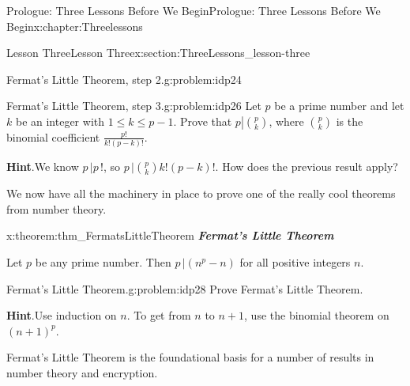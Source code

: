 \documentclass[oneside,10pt,]{book}
\newcommand{\blocktitlefont}{\relax}
\newcommand{\alert}[1]{\textbf{\textit{#1}}}
\numberwithin{equation}{section}
\begin{document}
\begin{chapterptx}{Prologue: Three Lessons Before We Begin}{}{Prologue: Three Lessons Before We Begin}{}{}{x:chapter:Threelessons}
\begin{sectionptx}{Lesson Three}{}{Lesson Three}{}{}{x:section:ThreeLessons_lesson-three}
\begin{problem}{Fermat's Little Theorem, step 2.}{g:problem:idp24}
\end{problem}
\begin{problem}{Fermat's Little Theorem, step 3.}{g:problem:idp26}%
 Let \(p\) be a prime number and let \(k\) be an integer with \(1\le k\le p-1\). Prove that \(p\left|{p \choose{}k}\right.\), where \({p \choose{}k}\) is the binomial coefficient \(\frac{p!}{k!(p-k)!}\).%
\par\smallskip%
\noindent\textbf{\blocktitlefont Hint}.\hypertarget{g:hint:idp27}{}\quad{}We know \(p\,|p\,!\), so \(p\,|{p
\choose{}k}k!(p-k)!\).  How does the previous result apply?%
\end{problem}
We now have all the machinery in place to prove one of the really cool theorems from number theory.%
\begin{theorem}{}{}{x:theorem:thm_FermatsLittleTheorem}%
\alert{Fermat's Little Theorem}%
\par
{} Let \(p\) be any prime number. Then \(p\,|(n^p-n)\) for all positive integers \(n\).%
\end{theorem}
\begin{problem}{Fermat's Little Theorem.}{g:problem:idp28}%
 Prove Fermat's Little Theorem.%
\par\smallskip%
\noindent\textbf{\blocktitlefont Hint}.\hypertarget{g:hint:idp29}{}\quad{}Use induction on \(n\). To get from \(n\) to \(n+1\), use the binomial theorem on \((n+1)^p\).%
\end{problem}
Fermat's Little Theorem is the foundational basis for a number of results in number theory and encryption.%
\end{sectionptx}
\end{chapterptx}
%
%
\typeout{************************************************}
\typeout{************************************************}
%
\end{document}
